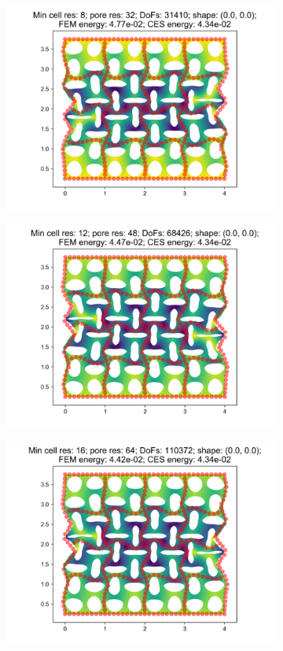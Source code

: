 \begin{figure}[H]
\begin{subfigure}{.45\textwidth}
\end{subfigure}
\begin{subfigure}{.45\textwidth}
  \centering
  \includegraphics[width=.8\linewidth]{lces/vis_compression/bm_6_mesh_3.png}
\end{subfigure}
\newline
\begin{subfigure}{.45\textwidth}
  \centering
  \includegraphics[width=.8\linewidth]{lces/vis_compression/bm_6_mesh_4.png}
\end{subfigure}
\begin{subfigure}{.45\textwidth}
  \centering
  \includegraphics[width=.8\linewidth]{lces/vis_compression/bm_6_mesh_5.png}
\end{subfigure}
\end{figure}

